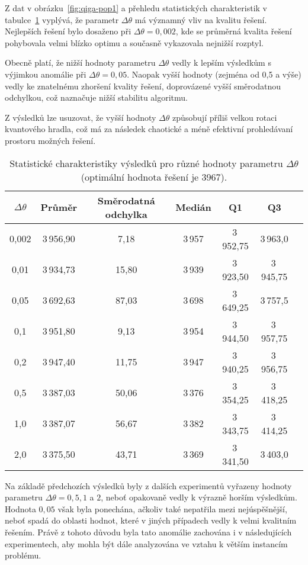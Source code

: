 Z dat v obrázku~\ref{fig:qiga-pop1} a přehledu statistických charakteristik v tabulce~\ref{tab:qiga-theta-stats} vyplývá, že parametr $\Delta\theta$ má významný vliv na kvalitu řešení. 
Nejlepších řešení bylo dosaženo při $\Delta\theta = 0,002$, kde se průměrná kvalita řešení pohybovala velmi blízko optimu a současně vykazovala nejnižší rozptyl. 

Obecně platí, že nižší hodnoty parametru $\Delta\theta$ vedly k lepším výsledkům s výjimkou anomálie při $\Delta\theta = 0,05$. 
Naopak vyšší hodnoty (zejména od 0,5 a výše) vedly ke znatelnému zhoršení kvality řešení, doprovázené vyšší směrodatnou odchylkou, což naznačuje nižší stabilitu algoritmu. 

Z výsledků lze usuzovat, že vyšší hodnoty $\Delta\theta$ způsobují příliš velkou rotaci kvantového hradla, což má za následek chaotické a méně efektivní prohledávaní prostoru možných řešení. 
\begin{table}[ht]
    \centering
    \begin{tabular}{c c c c c c c}
        \toprule
        \(\Delta\theta\) & Průměr & Směrodatná odchylka & Medián & Q1 & Q3\\
        \midrule
        0,002 & 3\,956,90 & 7,18  & 3\,957 & 3\,952,75 & 3\,963,0  \\
        0,01  & 3\,934,73 & 15,80 & 3\,939 & 3\,923,50 & 3\,945,75 \\
        0,05  & 3\,692,63 & 87,03 & 3\,698 & 3\,649,25 & 3\,757,5  \\
        0,1   & 3\,951,80 & 9,13  & 3\,954 & 3\,944,50 & 3\,957,75 \\
        0,2   & 3\,947,40 & 11,75 & 3\,947 & 3\,940,25 & 3\,956,75 \\
        0,5   & 3\,387,03 & 50,06 & 3\,376 & 3\,354,25 & 3\,418,25 \\
        1,0   & 3\,387,07 & 56,67 & 3\,382 & 3\,343,75 & 3\,414,25 \\
        2,0   & 3\,375,50 & 43,71 & 3\,369 & 3\,341,50 & 3\,403,0  \\
        \bottomrule
    \end{tabular}
    \caption{Statistické charakteristiky výsledků pro různé hodnoty parametru \(\Delta\theta\) (optimální hodnota řešení je 3967).}
    \label{tab:qiga-theta-stats}
\end{table}

Na základě předchozích výsledků byly z dalších experimentů vyřazeny hodnoty parametru $\Delta\theta = 0,5, 1$ a $2$, neboť opakovaně vedly k výrazně horším výsledkům. 
Hodnota $0,05$ však byla ponechána, ačkoliv také nepatřila mezi nejúspěšnější, neboť spadá do oblasti hodnot, které v jiných případech vedly k velmi kvalitním řešením. 
Právě z tohoto důvodu byla tato anomálie zachována i v následujících experimentech, aby mohla být dále analyzována ve vztahu k větším instancím problému. 

